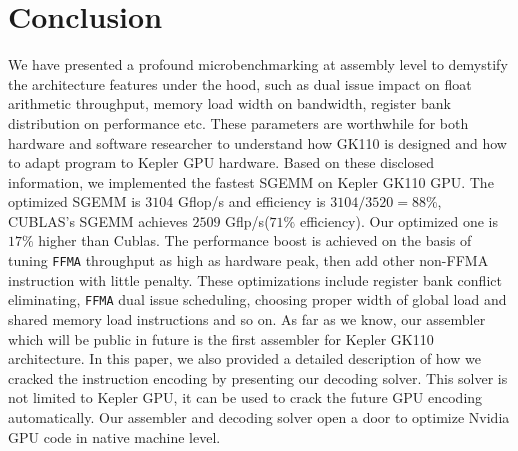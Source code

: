 \section{Conclusion}
\label{sec:conclusion}
We have presented a profound microbenchmarking at assembly level to demystify the architecture features under the hood, such as dual issue impact on float arithmetic throughput, memory load width on bandwidth, register bank distribution on performance etc. These parameters are worthwhile for both hardware and software researcher to understand how GK110 is designed and how to adapt program to Kepler GPU hardware.
Based on these disclosed information, we implemented the fastest SGEMM on Kepler GK110 GPU. The optimized SGEMM is $3104$ Gflop/s and efficiency is $3104/3520=88\%$, CUBLAS's SGEMM achieves $2509$ Gflp/s($71\%$ efficiency). Our optimized one is $17\%$ higher than Cublas. The performance boost is achieved on the basis of tuning {\tt FFMA} throughput as high as hardware peak, then add other non-FFMA instruction with little penalty. These optimizations include register bank conflict eliminating, {\tt FFMA} dual issue scheduling, choosing proper width of global load and shared memory load instructions and so on.
As far as we know, our assembler which will be public in future is the first assembler for Kepler GK110 architecture. In this paper, we also provided a detailed description of how we cracked the instruction encoding by presenting our decoding solver. This solver is not limited to Kepler GPU, it can be used to crack the future GPU encoding automatically. Our assembler and decoding solver open a door to optimize Nvidia GPU code in native machine level.
